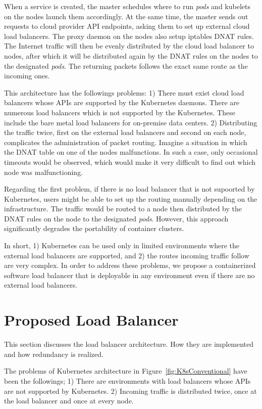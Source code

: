 When a service is created, the master schedules where to run {\em pods} and kubelets on the nodes launch them accordingly.
At the same time, the master sends out requests to cloud provider API endpoints, asking them to set up external cloud load balancers.
The proxy daemon on the nodes also setup iptables DNAT\cite{MartinA.Brown2017} rules. 
The Internet traffic will then be evenly distributed by the cloud load balancer to nodes, 
after which it will be distributed again by the DNAT rules on the nodes to the designated {\em pods}. 
The returning packets follows the exact same route as the incoming ones.

This architecture has the followings problems: 
1) There must exist cloud load balancers whose APIs are supported by the Kubernetes daemons.
There are numerous load balancers which is not supported by the Kubernetes.
These include the bare metal load balancers for on-premise data centers.
2) Distributing the traffic twice, first on the external load balancers and second on each node, complicates the administration of packet routing. 
Imagine a situation in which the DNAT table on one of the nodes malfunctions.
In such a case, only occasional timeouts would be observed, which would make it very difficult to find out which node was malfunctioning.   

Regarding the first problem, if there is no load balancer that is not supoorted by Kubernetes, users might be able to set up the routing manually depending on the infrastructure.
The traffic would be routed to a node then distributed by the DNAT rules on the node to the designated {\em pods}.
However, this approach significantly degrades the portability of container clusters.

In short, 1) Kubernetes can be used only in limited environments where the external load balancers are supported, and 2) the routes incoming traffic follow are very complex.
In order to address these problems, we propose a containerized software load balancer 
that is deployable in any environment even if there are no external load balancers.

\section{Proposed Load Balancer}\label{proposed_arch}

This section discusses the load balancer architecture.
How they are implemented and how redundancy is realized.

The problems of Kubernetes architecture in Figure~\ref{fig:K8sConventional} have been the followings;
1) There are environments with load balancers whose APIs are not supported by Kubernetes.
2) Incoming traffic is distributed twice, once at the load balancer and once at every node.

